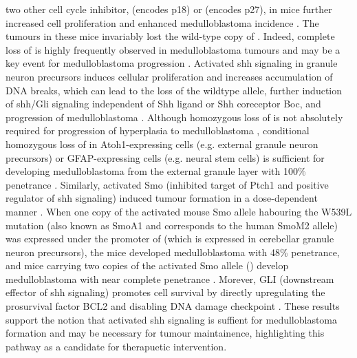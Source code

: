 two other cell cycle inhibitor,  (encodes p18) or  (encodes p27), in  mice further increased cell proliferation and enhanced medulloblastoma incidence . The tumours in these mice invariably lost the wild-type copy of  . Indeed, complete loss of  is highly frequently observed in medulloblastoma tumours and may be a key event for medulloblastoma progression . Activated \gls{shh} signaling in \high{-/+} granule neuron precursors induces cellular proliferation and increases accumulation of DNA breaks, which can lead to the loss of the wildtype  allele, further induction of \gls{shh}/Gli signaling independent of Shh ligand or Shh coreceptor Boc, and progression of medulloblastoma . Although homozygous loss of  is not absolutely required for progression of hyperplasia to medulloblastoma , conditional homozygous loss of  in Atoh1-expressing cells (e.g. external granule neuron precursors) or GFAP-expressing cells (e.g. neural stem cells) is sufficient for developing medulloblastoma from the external granule layer with 100\% penetrance . Similarly, activated Smo (inhibited target of Ptch1 and positive regulator of \gls{shh} signaling) induced tumour formation in a dose-dependent manner . When one copy of the activated mouse Smo allele habouring the W539L mutation (also known as SmoA1 and corresponds to the human SmoM2 allele) was expressed under the promoter of  (which is expressed in cerebellar granule neuron precursors), the mice developed medulloblastoma with 48\% penetrance, and mice carrying two copies of the activated Smo allele () develop medulloblastoma with near complete penetrance . Morever, GLI (downstream effector of \gls{shh} signaling) promotes cell survival by directly upregulating the prosurvival factor BCL2  and disabling DNA damage checkpoint . These results support the notion that activated \gls{shh} signaling is suffient for medulloblastoma formation and may be necessary for tumour maintainence, highlighting this pathway as a candidate for therapuetic intervention.


